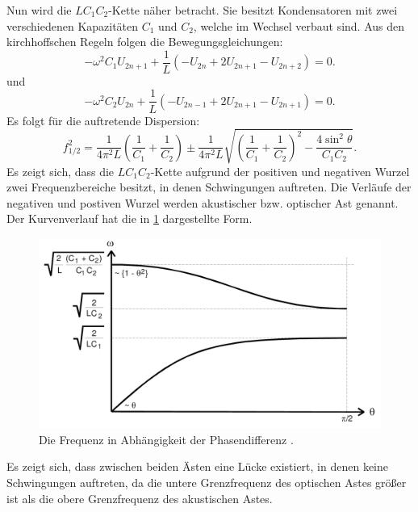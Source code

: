  Nun wird die $LC_1C_2$-Kette näher betracht. Sie besitzt Kondensatoren mit zwei
  verschiedenen Kapazitäten $C_1$ und $C_2$, welche im Wechsel verbaut sind.
 Aus den kirchhoffschen Regeln folgen die Bewegungsgleichungen:
 \begin{equation}
   -\omega^2 C_1 U_{2n+1} + \frac{1}{L} \left( -U_{2n} + 2U_{2n+1} - U_{2n+2} \right) = 0\text{.}
 \end{equation}
 und
 \begin{equation}
   -\omega^2 C_2 U_{2n} + \frac{1}{L} \left( -U_{2n-1} + 2U_{2n+1} - U_{2n+1} \right) = 0\text{.}
 \end{equation}
Es folgt für die auftretende Dispersion:
\begin{equation}
  f_{1/2}^2 = \frac{1}{4\pi^2L}\left(\frac{1}{C_1}+\frac{1}{C_2}\right) \pm \frac{1}{4\pi^2L}\sqrt{\left(\frac{1}{C_1}+\frac{1}{C_2} \right)^2 - \frac{4 \sin^2\theta}{C_1C_2}}\text{.}
\end{equation}
Es zeigt sich, dass die $LC_1C_2$-Kette aufgrund der positiven und negativen Wurzel
zwei Frequenzbereiche besitzt, in denen Schwingungen auftreten. Die Verläufe der
 negativen und postiven Wurzel werden akustischer bzw. optischer Ast genannt.
 Der Kurvenverlauf hat die in \ref{fig:thetaf} dargestellte Form.
 \begin{figure}[H]
   \centering
   \includegraphics[width=\linewidth-100pt,height=\textheight-100pt,keepaspectratio]{content/Grafiken/Dispersionskurven.png}
   \caption{Die Frequenz in Abhängigkeit der Phasendifferenz \cite{V356}.}
   \label{fig:thetaf}
 \end{figure}
 Es zeigt sich, dass zwischen beiden Ästen eine Lücke existiert,
  in denen keine Schwingungen auftreten, da die untere Grenzfrequenz des
   optischen Astes größer ist als die obere Grenzfrequenz des akustischen Astes.
